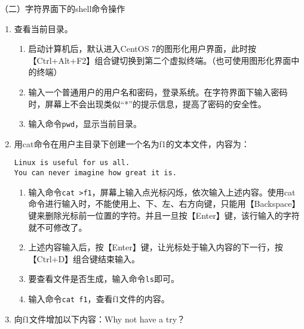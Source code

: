 \vspace{0.1in}
（二）字符界面下的shell命令操作
\begin{enumerate}
  \item 查看当前目录。
    \begin{enumerate}
      \item 启动计算机后，默认进入CentOS 7的图形化用户界面，此时按【Ctrl+Alt+F2】组合键切换到第二个虚拟终端。（也可使用图形化界面中的终端）
      \item 输入一个普通用户的用户名和密码，登录系统。在字符界面下输入密码时，屏幕上不会出现类似“*”的提示信息，提高了密码的安全性。
      \item 输入命令\verb|pwd|，显示当前目录。
    \end{enumerate}
  \item 用cat命令在用户主目录下创建一个名为f1的文本文件，内容为：
\begin{verbatim}
Linux is useful for us all.
You can never imagine how great it is.
\end{verbatim}
    \begin{enumerate}
      \item 输入命令\verb|cat >f1|，屏幕上输入点光标闪烁，依次输入上述内容。使用cat命令进行输入时，不能使用上、下、左、右方向键，只能用【Backspace】键来删除光标前一位置的字符。并且一旦按【Enter】键，该行输入的字符就不可修改了。
      \item 上述内容输入后，按【Enter】键，让光标处于输入内容的下一行，按【Ctrl+D】组合键结束输入。
      \item 要查看文件是否生成，输入命令\verb|ls|即可。
      \item 输入命令\verb|cat f1|，查看f1文件的内容。
    \end{enumerate}
  \item 向f1文件增加以下内容：Why not have a try？


\end{enumerate}
